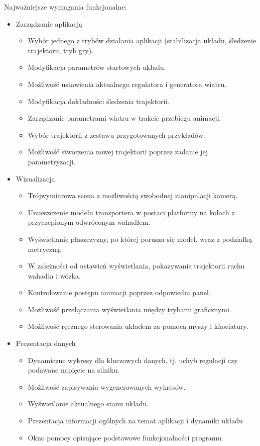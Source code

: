 \documentclass[12pt, twoside, openany]{report}
\theoremstyle{definition}
\begin{document}
Najważniejsze wymagania funkcjonalne:
\begin{itemize}
\item Zarządzanie aplikacją
\begin{itemize}
\item Wybór jednego z trybów działania aplikacji (stabilizacja układu, śledzenie trajektorii, tryb gry).
\item Modyfikacja parametrów startowych układu.
\item Możliwość ustawienia aktualnego regulatora i generatora wiatru.
\item Modyfikacja dokładności śledzenia trajektorii.
\item Zarządzanie parametrami wiatru w trakcie przebiegu animacji.
\item Wybór trajektorii z zestawu przygotowanych przykładów.
\item Możliwość stworzenia nowej trajektorii poprzez zadanie jej parametryzacji.
\end{itemize}
\item Wizualizacja
\begin{itemize}
\item Trójwymiarowa scena z możliwością swobodnej manipulacji kamerą.
\item Umieszczenie modelu transportera w postaci platformy na kołach z przyczepionym odwróconym wahadłem.
\item Wyświetlanie płaszczyzny, po której porusza się model, wraz z podziałką metryczną. 
\item W zależności od ustawień wyświetlania, pokazywanie trajektorii ruchu wahadła i wózka.
\item Kontrolowanie postępu animacji poprzez odpowiedni panel.
\item Możliwość przełączania wyświetlania między trybami graficznymi.
\item Możliwość ręcznego sterowania układem za pomocą myszy i klawiatury.
\end{itemize}
\item Prezentacja danych
\begin{itemize}
\item Dynamiczne wykresy dla kluczowych danych, tj. uchyb regulacji czy podawane napięcie na silniku.
\item Możliwość zapisywania wygenerowanych wykresów.
\item Wyświetlanie aktualnego stanu układu.
\item Prezentacja informacji ogólnych na temat aplikacji i dynamiki układu
\item Okno pomocy opisujące podstawowe funkcjonalności programu.
\end{itemize}
\end{itemize}
\end{document}
